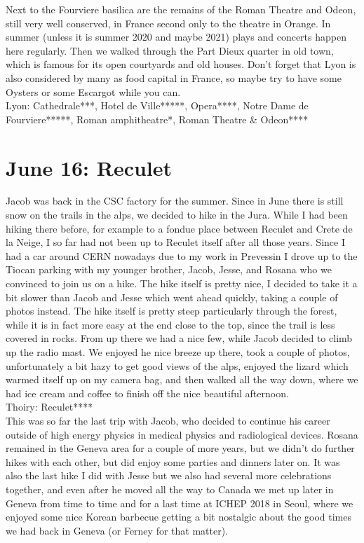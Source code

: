 Next to the Fourviere basilica are the remains of the Roman Theatre and Odeon, still very well conserved, in France second only to the theatre in Orange. In summer (unless it is summer 2020 and maybe 2021) plays and concerts happen here regularly. Then we walked through the Part Dieux quarter in old town, which is famous for its open courtyards and old houses. Don't forget that Lyon is also considered by many as food capital in France, so maybe try to have some Oysters or some Escargot while you can.\\

Lyon: Cathedrale***, Hotel de Ville*****, Opera****, Notre Dame de Fourviere*****, Roman amphitheatre*, Roman Theatre \& Odeon****\\

\section{June 16: Reculet}
\label{Reculet2013}

Jacob was back in the CSC factory for the summer. Since in June there is still snow on the trails in the alps, we decided to hike in the Jura. While I had been hiking there before, for example to a fondue place between Reculet and Crete de la Neige, I so far had not been up to Reculet itself after all those years. Since I had a car around CERN nowadays due to my work in Prevessin I drove up to the Tiocan parking with my younger brother, Jacob, Jesse, and Rosana who we convinced to join us on a hike. The hike itself is pretty nice, I decided to take it a bit slower than Jacob and Jesse which went ahead quickly, taking a couple of photos instead. The hike itself is pretty steep particularly through the forest, while it is in fact more easy at the end close to the top, since the trail is less covered in rocks. From up there we had a nice few, while Jacob decided to climb up the radio mast. We enjoyed he nice breeze up there, took a couple of photos, unfortunately a bit hazy to get good views of the alps, enjoyed the lizard which warmed itself up on my camera bag, and then walked all the way down, where we had ice cream and coffee to finish off the nice beautiful afternoon.\\

Thoiry: Reculet****\\

This was so far the last trip with Jacob, who decided to continue his career outside of high energy physics in medical physics and radiological devices. Rosana remained in the Geneva area for a couple of more years, but we didn't do further hikes with each other, but did enjoy some parties and dinners later on. It was also the last hike I did with Jesse but we also had several more celebrations together, and even after he moved all the way to Canada we met up later in Geneva from time to time and for a last time at ICHEP 2018 in Seoul, where we enjoyed some nice Korean barbecue getting a bit nostalgic about the good times we had back in Geneva (or Ferney for that matter).

